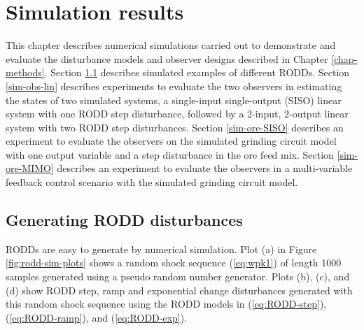 \chapter{Simulation results}
\label{chap-simulation}

This chapter describes numerical simulations carried out to demonstrate and evaluate the disturbance models and observer designs described in Chapter \ref{chap-methods}. Section \ref{sim-RODDs} describes simulated examples of different RODDs. Section \ref{sim-obs-lin} describes experiments to evaluate the two observers in estimating the states of two simulated systems, a single-input single-output (SISO) linear system with one RODD step disturbance, followed by a 2-input, 2-output linear system with two RODD step disturbances. Section \ref{sim-ore-SISO} describes an experiment to evaluate the observers on the simulated grinding circuit model with one output variable and a step disturbance in the ore feed mix. Section \ref{sim-ore-MIMO} describes an experiment to evaluate the observers in a multi-variable feedback control scenario with the simulated grinding circuit model.


\section{Generating RODD disturbances} \label{sim-RODDs}

RODDs are easy to generate by numerical simulation.  Plot (a) in Figure \ref{fig:rodd-sim-plots} shows a random shock sequence (\ref{eq:wpk1}) of length 1000 samples generated using a pseudo random number generator. Plots (b), (c), and (d) show RODD step, ramp and exponential change disturbances generated with this random shock sequence using the RODD models in (\ref{eq:RODD-step}), (\ref{eq:RODD-ramp}), and (\ref{eq:RODD-exp}). 

